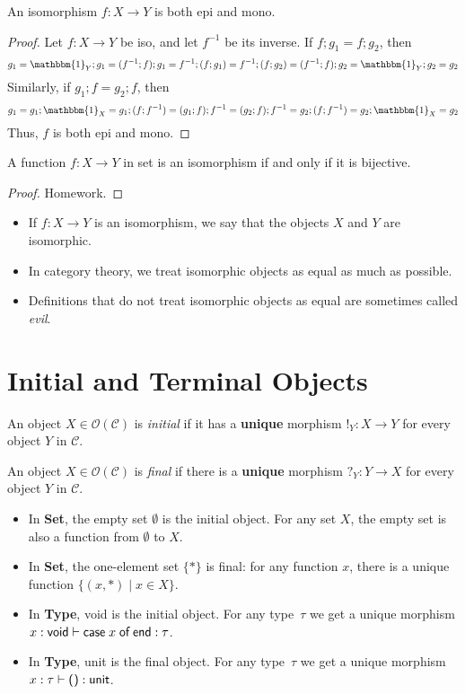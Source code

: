 \documentclass{lecturenotes}
\newcommand{\utype}{\textsf{unit}\xspace}
\newcommand{\unit}{\ensuremath{\textsf{(}\mkern0.5mu\textsf{)}}}
\newcommand{\vtype}{\textsf{void}\xspace}
\newcommand{\vcase}[1]{\ensuremath{\textsf{case}\mkern5mu#1\mkern5mu\textsf{of}\mkern5mu\textsf{end}}}
\newcommand{\obj}[1]{\ensuremath{\mathcal{O}(#1)}}
\newcommand{\id}[1][]{\ensuremath{\mathbbm{1}_{#1}}}
\newcommand{\Set}{\textbf{Set}\xspace}
\newcommand{\Type}{\textbf{Type}\xspace}
\begin{document}
\begin{thm}
  An isomorphism $f : X \to Y$ is both epi and mono.
\end{thm}
\begin{proof}
  Let $f : X \to Y$ be iso, and let $f^{-1}$ be its inverse.
  If $f; g_1 = f; g_2$, then $$g_1 = \id[Y]; g_1 = (f^{-1}; f); g_1 = f^{-1}; (f; g_1) = f^{-1}; (f; g_2) = (f^{-1}; f); g_2 = \id[Y]; g_2 = g_2$$
  Similarly, if $g_1; f = g_2; f$, then $$g_1 = g_1; \id[X] = g_1; (f; f^{-1}) = (g_1; f); f^{-1} = (g_2; f); f^{-1} = g_2; (f; f^{-1}) = g_2; \id[X] = g_2$$
  Thus, $f$ is both epi and mono.
\end{proof}

\begin{thm}[Isomorphisms in \Set]
  A function $f : X \to Y$ in set is an isomorphism if and only if it is bijective.
\end{thm}
\begin{proof}
  Homework.
\end{proof}

\begin{itemize}
\item If $f : X \to Y$ is an isomorphism, we say that the objects $X$ and $Y$ are isomorphic.
\item In category theory, we treat isomorphic objects as equal as much as possible.
\item Definitions that do not treat isomorphic objects as equal are sometimes called \emph{evil}.
\end{itemize}

\section{Initial and Terminal Objects}

\begin{defn}
  An object $X \in \obj{\mathcal{C}}$ is \emph{initial} if it has a \textbf{unique} morphism $!_Y : X \to Y$ for every object $Y$ in $\mathcal{C}$.
\end{defn}

\begin{defn}
  An object $X \in \obj{\mathcal{C}}$ is \emph{final} if there is a \textbf{unique} morphism $?_Y : Y \to X$ for every object $Y$ in $\mathcal{C}$.
\end{defn}

\begin{itemize}
\item In \Set, the empty set $\emptyset$ is the initial object.
  For any set $X$, the empty set is also a function from $\emptyset$ to $X$.
\item In \Set, the one-element set $\{\ast\}$ is final: for any function $x$, there is a unique function $\{(x, \ast) \mid x \in X\}$.
\item In \Type, \vtype is the initial object.
  For any type~$\tau$ we get a unique morphism $x : \vtype \vdash \vcase{x} : \tau$.
\item In \Type, \utype is the final object.
  For any type~$\tau$ we get a unique morphism $x : \tau \vdash \unit : \utype$.
\end{itemize}
\end{document}
